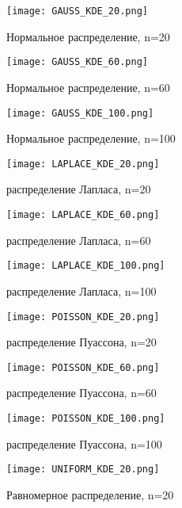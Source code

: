 \documentclass{article}
\begin{document}
\begin{figure}[H]
	{\texttt{[image: GAUSS\_KDE\_20.png]}}
		\caption{Нормальное распределение, n=20} 
		\label{fig:normal}
	\end{figure}
	
\begin{figure}[H]
	{\texttt{[image: GAUSS\_KDE\_60.png]}}
		\caption{Нормальное распределение, n=60} 
		\label{fig:normal}
	\end{figure}
		
\begin{figure}[H]
	{\texttt{[image: GAUSS\_KDE\_100.png]}}
		\caption{Нормальное распределение, n=100} 
		\label{fig:normal}
	\end{figure}


	
\begin{figure}[H]
	{\texttt{[image: LAPLACE\_KDE\_20.png]}}
		\caption{распределение Лапласа, n=20} 
		\label{fig:normal}
	\end{figure}

\begin{figure}[H]
	{\texttt{[image: LAPLACE\_KDE\_60.png]}}
		\caption{распределение Лапласа, n=60} 
		\label{fig:normal}
	\end{figure}
		
\begin{figure}[H]
	{\texttt{[image: LAPLACE\_KDE\_100.png]}}
		\caption{распределение Лапласа, n=100} 
		\label{fig:normal}
	\end{figure}
		
\begin{figure}[H]
	{\texttt{[image: POISSON\_KDE\_20.png]}}
		\caption{распределение Пуассона, n=20} 
		\label{fig:normal}
	\end{figure}
	
\begin{figure}[H]
	{\texttt{[image: POISSON\_KDE\_60.png]}}
		\caption{распределение Пуассона, n=60} 
		\label{fig:normal}
	\end{figure}
	
\begin{figure}[H]
	{\texttt{[image: POISSON\_KDE\_100.png]}}
		\caption{распределение Пуассона, n=100} 
		\label{fig:normal}
	\end{figure}
	
\begin{figure}[H]
	{\texttt{[image: UNIFORM\_KDE\_20.png]}}
		\caption{Равномерное распределение, n=20} 
		\label{fig:normal}
	\end{figure}
	
\end{document}
